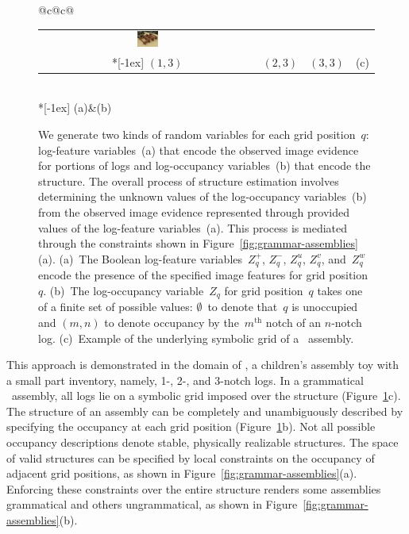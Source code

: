 \begin{figure}
\begin{tabular}{@{}c@{\hspace{2pt}}c@{}}
\begin{tabular}[b]{@{}c@{\hspace{2pt}}c@{\hspace{2pt}}c@{\hspace{2pt}}c@{}}
      \includegraphics[width=0.1\textwidth]{images/pose2-cut}\\*[-1ex]
      {\tiny $(1,3)$}&{\tiny $(2,3)$}&{\tiny $(3,3)$}&{\small (c)}\\
    \end{tabular}
    \\*[-1ex]
     {\small (a)}&{\small (b)}
  \end{tabular}
  \par\vspace*{-2ex}
  \caption{We generate two kinds of random variables for each grid
    position~$q$: log-feature variables~(a) that encode the observed image
    evidence for portions of logs and log-occupancy variables~(b) that encode
    the structure.
    The overall process of structure estimation involves determining the
    unknown values of the log-occupancy variables~(b) from the observed image
    evidence represented through provided values of the log-feature
    variables~(a).
    This process is mediated through the constraints shown in
    Figure~\protect\ref{fig:grammar-assemblies}(a).
    (a)~The Boolean log-feature variables~$Z^+_q$, $Z^-_q$, $Z^u_q$, $Z^v_q$,
    and~$Z^w_q$ encode the presence of the specified image features for grid
    position~$q$.
    (b)~The log-occupancy variable~$Z_q$ for grid position~$q$ takes one of
    a finite set of possible values: $\emptyset$~to denote that~$q$ is
    unoccupied and $(m,n)$ to denote occupancy by the~$m^{\textrm{th}}$ notch
    of an $n$-notch log.
    (c)~Example of the underlying symbolic grid of a \LincolnLog\
    assembly.}
  \label{fig:lincoln-logs}
  \par\vspace*{-2.5ex}
\end{figure}

This approach is demonstrated in the domain of \LincolnLogs, a children's
assembly toy with a small part inventory, namely, 1-, 2-, and 3-notch
logs.
%
In a grammatical \LincolnLog\ assembly, all logs lie on a symbolic grid imposed
over the structure (Figure~\ref{fig:lincoln-logs}c).
%
The structure of an assembly can be completely and unambiguously described by
specifying the occupancy at each grid position
(Figure~\ref{fig:lincoln-logs}b).
%
Not all possible occupancy descriptions denote stable, physically realizable
structures.
%
The space of valid structures can be specified by local constraints on the
occupancy of adjacent grid positions, as shown in
Figure~\ref{fig:grammar-assemblies}(a).
%
Enforcing these constraints over the entire structure renders some assemblies
grammatical and others ungrammatical, as shown in
Figure~\ref{fig:grammar-assemblies}(b).

